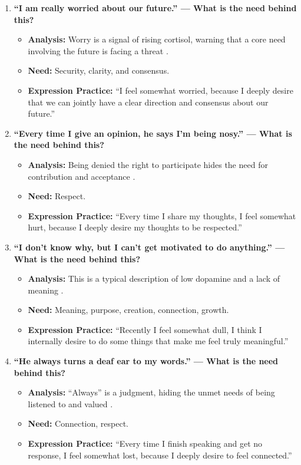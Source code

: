 \begin{enumerate}
    \item \textbf{``I am really worried about our future.'' --- What is the need behind this?}
    \begin{itemize}
        \item \textbf{Analysis:} Worry is a signal of rising cortisol,
        warning that a core need involving the future is facing a threat \citep{herman2025}.
        \item \textbf{Need:} Security, clarity, and consensus.
        \item \textbf{Expression Practice:} ``I feel somewhat worried,
        because I deeply desire that we can jointly have a clear direction
        and consensus about our future.''
    \end{itemize}

    \item \textbf{``Every time I give an opinion, he says I'm being nosy.'' --- What is the need behind this?}
    \begin{itemize}
        \item \textbf{Analysis:} Being denied the right to participate
        hides the need for contribution and acceptance \citep{hoffman2000}.
        \item \textbf{Need:} Respect.
        \item \textbf{Expression Practice:} ``Every time I share my
        thoughts, I feel somewhat hurt, because I deeply desire my thoughts
        to be respected.''
    \end{itemize}

    \item \textbf{``I don't know why, but I can't get motivated to do anything.'' --- What is the need behind this?}
    \begin{itemize}
        \item \textbf{Analysis:} This is a typical description of low
        dopamine and a lack of meaning \citep{dweck2006}.
        \item \textbf{Need:} Meaning, purpose, creation, connection, growth.
        \item \textbf{Expression Practice:} ``Recently I feel somewhat dull,
        I think I internally desire to do some things that make me feel
        truly meaningful.''
    \end{itemize}

    \item \textbf{``He always turns a deaf ear to my words.'' --- What is the need behind this?}
    \begin{itemize}
        \item \textbf{Analysis:} ``Always'' is a judgment, hiding the unmet
        needs of being listened to and valued \citep{rogers1961}.
        \item \textbf{Need:} Connection, respect.
        \item \textbf{Expression Practice:} ``Every time I finish speaking
        and get no response, I feel somewhat lost, because I deeply desire
        to feel connected.''
    \end{itemize}


\end{enumerate}
